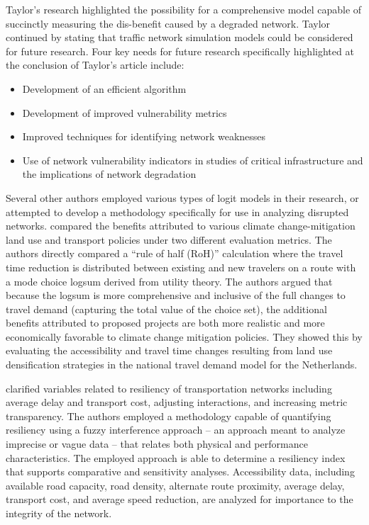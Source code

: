 Taylor's research highlighted the possibility for a comprehensive model capable
of succinctly measuring the dis-benefit caused by a degraded network.
Taylor continued by stating that traffic network simulation models
could be considered for future research.  Four key needs for
future research specifically highlighted at the conclusion of Taylor's article include:

	\begin{itemize}
		\item {Development of an efficient algorithm}
		\item {Development of improved vulnerability metrics}
		\item {Improved techniques for identifying network weaknesses}
		\item {Use of network vulnerability indicators in studies of critical
		infrastructure and the implications of network degradation}
	\end{itemize}

Several other authors employed various types of logit models in their research,
or attempted to develop a methodology specifically for use in analyzing disrupted networks.
\citet{geurs2010} compared the benefits attributed to various climate
change-mitigation land use and transport policies under two different
evaluation metrics. The authors directly compared a “rule of half (RoH)”
calculation where the travel time reduction is distributed between existing
and new travelers on a route with a mode choice logsum derived from utility
theory. The authors argued that because the logsum is more comprehensive and
inclusive of the full changes to travel demand (capturing the total value of
the choice set), the additional benefits attributed to proposed projects are
both more realistic and more economically favorable to climate change
mitigation policies. They showed this by evaluating the accessibility and
travel time changes resulting from land use densification strategies in the
national travel demand model for the Netherlands.

\citet{serulle2011} clarified variables related to resiliency
of transportation networks including average delay and transport cost,
adjusting interactions,
and increasing metric transparency. The authors employed a methodology
capable of quantifying
resiliency using a fuzzy interference approach – an approach meant to analyze
imprecise or vague data
– that relates both physical and performance characteristics. The employed approach
is able to determine a
resiliency index that supports comparative and sensitivity analyses.
Accessibility data, including
available road capacity, road density, alternate route proximity, average
delay, transport cost,
and average speed reduction, are analyzed for importance to the integrity
of the network.

